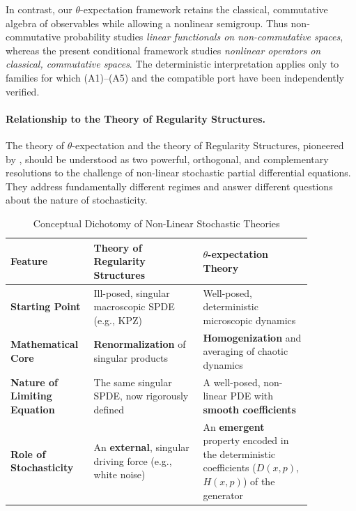 \documentclass[12pt, letterpaper]{amsart}
\newcommand{\ThetaExpectation}{$\theta$-expectation}
\theoremstyle{plain}
\theoremstyle{definition}
\theoremstyle{remark}
\begin{document}
In contrast, our \ThetaExpectation{} framework retains the classical, commutative algebra of observables while allowing a nonlinear semigroup.  Thus non-commutative probability studies \textit{linear functionals on non-commutative spaces}, whereas the present conditional framework studies \textit{nonlinear operators on classical, commutative spaces}.  The deterministic interpretation applies only to families for which \textup{(A1)--(A5)} and the compatible port have been independently verified.


\paragraph{\textbf{Relationship to the Theory of Regularity Structures.}}
The theory of \ThetaExpectation{} and the theory of Regularity Structures, pioneered by \citep{Hairer2014}, should be understood as two powerful, orthogonal, and complementary resolutions to the challenge of non-linear stochastic partial differential equations. They address fundamentally different regimes and answer different questions about the nature of stochasticity.


\begin{center}
\begin{table}[!ht]
\caption{Conceptual Dichotomy of Non-Linear Stochastic Theories}
\label{tab:regularity_structures_comparison}
\renewcommand{\arraystretch}{1.4}
\begin{tabular}{L{0.20\linewidth}|L{0.33\linewidth}|L{0.33\linewidth}}
\hline \hline
\textbf{Feature} & \textbf{Theory of Regularity Structures} & \textbf{\ThetaExpectation{} Theory} \\
\hline
\textbf{Starting Point} & Ill-posed, singular macroscopic SPDE (e.g., KPZ) & Well-posed, deterministic microscopic dynamics \\
\hline
\textbf{Mathematical Core} & \textbf{Renormalization} of singular products & \textbf{Homogenization} and averaging of chaotic dynamics \\
\hline
\textbf{Nature of Limiting Equation} & The same singular SPDE, now rigorously defined & A well-posed, non-linear PDE with \textbf{smooth coefficients} \\
\hline
\textbf{Role of Stochasticity} & An \textbf{external}, singular driving force (e.g., white noise) & An \textbf{emergent} property encoded in the deterministic coefficients ($D(x,p)$, $H(x,p)$) of the generator \\
\hline \hline
\end{tabular}
\renewcommand{\arraystretch}{1.0}
\end{table}
\end{center}
\end{document}
